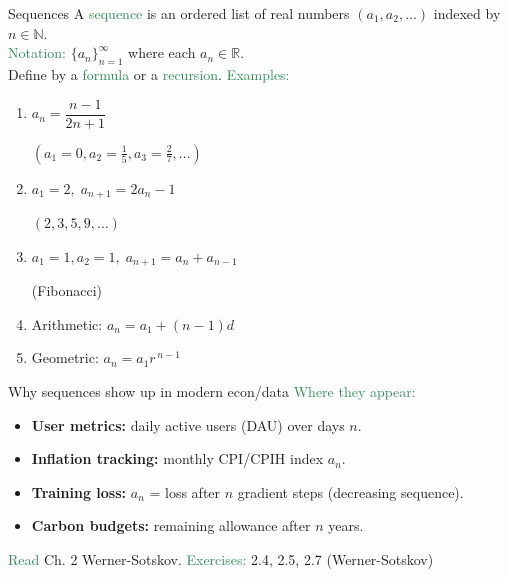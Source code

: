 \documentclass[11pt,aspectratio=169]{beamer}
\begin{document}
\begin{frame}{Sequences }
%
A \textcolor{SeaGreen}{sequence} is an ordered list of real numbers $(a_1,a_2,\ldots)$ indexed by $n\in\mathbb{N}$. \\[3mm]

\textcolor{SeaGreen}{Notation:} $\{a_n\}_{n=1}^{\infty}$ where each $a_n\in\mathbb{R}$.\\[6pt]
Define by a \textcolor{SeaGreen}{formula} or a \textcolor{SeaGreen}{recursion}.
\vskip 10pt
\textcolor{SeaGreen}{Examples:} 
\begin{enumerate}
\item $a_n=\dfrac{n-1}{2n+1}$\quad  \begin{tiny}$(a_1=0, a_2=\frac15,a_3=\frac27,\ldots)$ \end{tiny}
\item $a_1=2, \; a_{n+1}=2a_n-1$\quad  \begin{tiny}$(2,3,5,9,\ldots)$ \end{tiny}
\item $a_1=1, a_2=1, \; a_{n+1}=a_n+a_{n-1}$\quad  \begin{tiny}(Fibonacci)\end{tiny}
\item \alert{Arithmetic}: $a_{n}=a_1+(n-1)d$
\item \alert{Geometric}: $a_n=a_1 r^{\,n-1}$
\end{enumerate}
%
\end{frame}

\begin{frame}{Why sequences show up in modern econ/data}
%
\textcolor{SeaGreen}{Where they appear:}
\begin{itemize}
\item \textbf{User metrics:} daily active users (DAU) over days $n$.\\[3mm]
\item \textbf{Inflation tracking:} monthly CPI/CPIH index $a_n$.\\[3mm]
\item \textbf{Training loss:} $a_n$ = loss after $n$ gradient steps (decreasing sequence).\\[3mm]
\item \textbf{Carbon budgets:} remaining allowance after $n$ years.\\[6mm]
\end{itemize}
\textcolor{SeaGreen}{Read} Ch. 2 Werner-Sotskov.\quad
\textcolor{SeaGreen}{Exercises:} 2.4, 2.5, 2.7 (Werner-Sotskov)
%
\end{frame}
\end{document}
